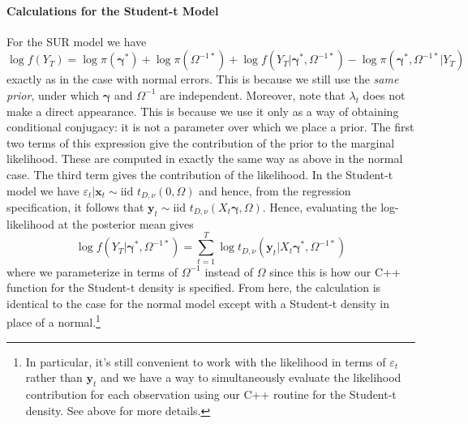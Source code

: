 \documentclass[12pt]{article}
\begin{document}
\paragraph{Calculations for the Student-t Model}
For the SUR model we have
\begin{equation*}
  \log f(Y_T) = \log \pi(\boldsymbol{\gamma}^*) + \log \pi(\Omega^{-1*}) + \log f(Y_T|\boldsymbol{\gamma}^*, \Omega^{-1*}) - \log \pi(\boldsymbol{\gamma}^*, \Omega^{-1*}|Y_T)
\end{equation*}
exactly as in the case with normal errors.
This is because we still use the \emph{same prior}, under which $\boldsymbol{\gamma}$ and $\Omega^{-1}$ are independent.
Moreover, note that $\lambda_t$ does not make a direct appearance.
This is because we use it only as a way of obtaining conditional conjugacy: it is not a parameter over which we place a prior.
The first two terms of this expression give the contribution of the prior to the marginal likelihood.
These are computed in exactly the same way as above in the normal case.
The third term gives the contribution of the likelihood.
In the Student-t model we have $\varepsilon_{t}|\mathbf{x}_t \sim \mbox{iid } t_{D,\nu}(0, \Omega)$ and hence, from the regression specification, it follows that $\mathbf{y}_t \sim \mbox{iid } t_{D,\nu}(X_t \boldsymbol{\gamma},\Omega)$.
Hence, evaluating the log-likelihood at the posterior mean gives
\begin{equation*}
  \log f(Y_T| \boldsymbol{\gamma}^*,\Omega^{-1*}) = \sum_{t=1}^{T} \log{ t_{D,\nu} \left(\mathbf{y}_t|X_t \boldsymbol{\gamma}^*, \Omega^{-1*}\right)}
\end{equation*}
where we parameterize in terms of $\Omega^{-1}$ instead of $\Omega$ since this is how our C++ function for the Student-t density is specified.
From here, the calculation is identical to the case for the normal model except with a Student-t density in place of a normal.\footnote{In particular, it's still convenient to work with the likelihood in terms of $\varepsilon_t$ rather than $\mathbf{y}_t$ and we have a way to simultaneously evaluate the likelihood contribution for each observation using our C++ routine for the Student-t density. See above for more details.}
\end{document}
